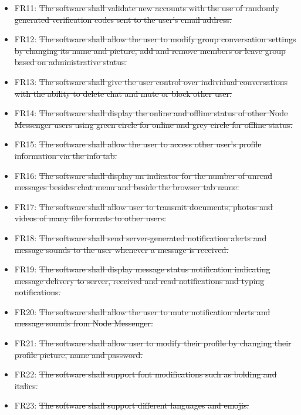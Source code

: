 \documentclass[12pt, titlepage]{article}
\begin{document}
	    \begin{itemize}
			\item FR11: \sout{The software shall validate new accounts with the use of randomly generated verification codes sent to the user's email address.}
			\item FR12: \sout{The software shall allow the user to modify group conversation settings by changing its name and picture, add and remove members or leave group based on administrative status.}	
			
			\item FR13: \sout{The software shall give the user control over individual conversations with the ability to delete chat and mute or block other user.}

		    \item FR14: \sout{The software shall display the online and offline status of other Node Messenger users using green circle for online and grey circle for offline status.}

		    \item FR15: \sout{The software shall allow the user to access other user's profile information via the info tab.}

		    \item FR16: \sout{The software shall display an indicator for the number of unread messages besides chat menu and beside the browser tab name.}
		    \item FR17: \sout{The software shall allow user to transmit documents, photos and videos of many file formats to other users.}
		    \item FR18: \sout{The software shall send server-generated notification alerts and message sounds to the user whenever a message is received.}
		    \item FR19: \sout{The software shall display message status notification indicating message delivery to server, received and read notifications and typing notifications.}
		    \item FR20: \sout{The software shall allow the user to mute notification alerts and message sounds from Node Messenger.}
		    \item FR21: \sout{The software shall allow user to modify their profile by changing their profile picture, name and password.}
		    \item FR22: \sout{The software shall support font modifications such as bolding and italics.}
		    \item FR23: \sout{The software shall support different languages and emojis.}
		\end{itemize}	
			
\end{document}
